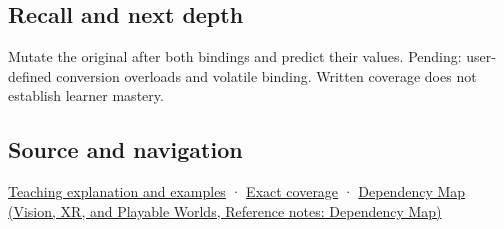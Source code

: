 \subsection{Recall and next depth}\label{appendix-37856d997bb0-recall-and-next-depth}

Mutate the original after both bindings and predict their values. Pending: user-defined conversion overloads and volatile binding. Written coverage does not establish learner mastery.

\subsection{Source and navigation}\label{appendix-37856d997bb0-source-and-navigation}

\hyperref[01-foundations-i-ch003-binding-chooses-a-referent-not-always-the-one-you-imagined]{Teaching explanation and examples} · \hyperref[appendix-fd090d982a15-m008---parts-113-126]{Exact coverage} · \href{../07-Vision-XR-and-Playable-Worlds/main.pdf\#nameddest=appendix-4ad47bdd269a}{Dependency Map (Vision, XR, and Playable Worlds, Reference notes: Dependency Map)}
